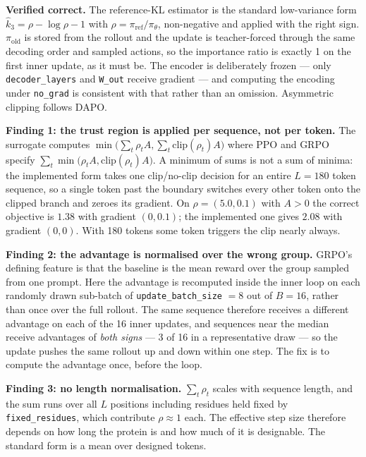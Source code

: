 \textbf{Verified correct.} The reference-KL estimator is the standard
low-variance form $\hat{k}_3 = \rho - \log\rho - 1$ with
$\rho = \pi_{\mathrm{ref}}/\pi_\theta$, non-negative and applied with the right
sign. $\pi_{\mathrm{old}}$ is stored from the rollout and the update is
teacher-forced through the same decoding order and sampled actions, so the
importance ratio is exactly 1 on the first inner update, as it must be. The
encoder is deliberately frozen --- only \texttt{decoder\_layers} and
\texttt{W\_out} receive gradient --- and computing the encoding under
\texttt{no\_grad} is consistent with that rather than an omission. Asymmetric
clipping follows DAPO.

\textbf{Finding 1: the trust region is applied per sequence, not per token.}
The surrogate computes $\min\bigl(\sum_t \rho_t A, \sum_t \mathrm{clip}(\rho_t) A\bigr)$
where PPO and GRPO specify $\sum_t \min\bigl(\rho_t A, \mathrm{clip}(\rho_t) A\bigr)$.
A minimum of sums is not a sum of minima: the implemented form takes one
clip/no-clip decision for an entire $L = 180$ token sequence, so a single token
past the boundary switches every other token onto the clipped branch and zeroes
its gradient. On $\rho = (5.0, 0.1)$ with $A > 0$ the correct objective is
$1.38$ with gradient $(0, 0.1)$; the implemented one gives $2.08$ with gradient
$(0,0)$. With 180 tokens some token triggers the clip nearly always.

\textbf{Finding 2: the advantage is normalised over the wrong group.} GRPO's
defining feature is that the baseline is the mean reward over the group sampled
from one prompt. Here the advantage is recomputed inside the inner loop on each
randomly drawn sub-batch of \texttt{update\_batch\_size} $= 8$ out of $B = 16$,
rather than once over the full rollout. The same sequence therefore receives a
different advantage on each of the 16 inner updates, and sequences near the
median receive advantages of \emph{both signs} --- 3 of 16 in a representative
draw --- so the update pushes the same rollout up and down within one step. The
fix is to compute the advantage once, before the loop.

\textbf{Finding 3: no length normalisation.} $\sum_t \rho_t$ scales with
sequence length, and the sum runs over all $L$ positions including residues held
fixed by \texttt{fixed\_residues}, which contribute $\rho \approx 1$ each. The
effective step size therefore depends on how long the protein is and how much of
it is designable. The standard form is a mean over designed tokens.

